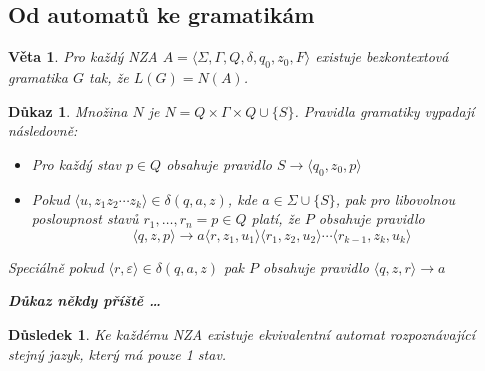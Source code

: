 \documentclass[10pt, a4paper, titlepage]{article}
\theoremstyle{note}
\newtheorem{veta}{\textbf{Věta}}
\newtheorem{dukaz}{\textbf{Důkaz}}
\newtheorem{dusledek}{\textbf{Důsledek}}
\begin{document}
\subsection{Od automatů ke gramatikám}

\begin{veta}
Pro každý NZA $A=\langle \Sigma,\Gamma,Q,\delta,q_0,z_0,F \rangle$ existuje bezkontextová gramatika $G$ tak, že $L(G)=N(A)$.
\end{veta}

\begin{dukaz}
Množina $N$ je $N=Q \times \Gamma \times Q \cup \lbrace S \rbrace$.
Pravidla gramatiky vypadají následovně:
\begin{itemize}
\item
Pro každý stav $p \in Q$ obsahuje pravidlo $S \rightarrow \langle q_0,z_0,p \rangle$
\item
Pokud $\langle u,z_1z_2\cdots z_k \rangle \in \delta(q,a,z)$, kde $a \in \Sigma \cup \lbrace S \rbrace$, pak pro
libovolnou posloupnost stavů $r_1,\ldots,r_n=p \in Q$ platí, že $P$ obsahuje pravidlo
$$\langle q,z,p \rangle \rightarrow a\langle r,z_1,u_1 \rangle\langle r_1,z_2,u_2 \rangle \cdots \langle r_{k-1},z_k,u_k \rangle$$
\end{itemize}

Speciálně pokud $\langle r, \varepsilon \rangle \in \delta(q,a,z)$ pak $P$ obsahuje pravidlo $\langle q,z,r \rangle \rightarrow a$

\textbf{Důkaz někdy příště \ldots}
\end{dukaz}

\begin{dusledek}
Ke každému NZA existuje ekvivalentní automat rozpoznávající stejný jazyk, který má pouze 1 stav.
\end{dusledek}


\renewcommand{\indexcolumns}{3}
\printindex
\end{document}
